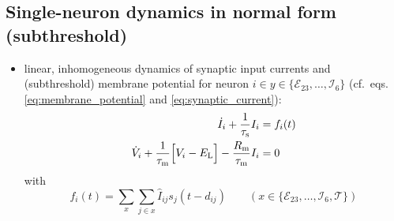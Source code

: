\documentclass[10pt,a4paper,twoside,american]{article}
\theoremstyle{definitionstyle}
\newcommand{\RM}{R_\text{m}}
\newcommand{\tauM}{\tau_\text{m}}
\newcommand{\tauS}{\tau_\text{s}}
\begin{document}
\clearpage
\renewcommand{\appendixtocname}{Appendix}
\renewcommand{\appendixpagename}{Appendix}
\renewcommand{\appendixname}{}
\begin{appendices}
  \renewcommand{\thesection}{A\arabic{section}}  
\section{Single-neuron dynamics in normal form (subthreshold)}
\label{sec:normal_form}
\begin{itemize}
\item linear, inhomogeneous dynamics of synaptic input currents and (subthreshold) membrane potential for neuron $i \in y\in\{\mathcal{E}_{23},\ldots,\mathcal{I}_{6}\}$ (cf.~eqs.\,\eqref{eq:membrane_potential} and \eqref{eq:synaptic_current}):
  \begin{equation}
    \label{eq:1st_order_ode}
    \begin{aligned}
      \dot{I}_{i} + \frac{1}{\tauS} I_{i} &= f_{i}(t)\\
      \dot{V}_{i} + \frac{1}{\tauM} \Bigl[ V_{i}-E_\text{L}\Bigr] - \frac{\RM}{\tauM} I_{i} &= 0
    \end{aligned}
  \end{equation}
  with
  \begin{equation}
	  f_{i}(t)=\sum_{x}\sum_{j\in x} \hat{I}_{ij} s_{j}(t-d_{ij})
    \qquad(x\in\{\mathcal{E}_{23},\ldots,\mathcal{I}_{6}, \mathcal{T}\})
  \end{equation}


\end{itemize}
\end{appendices}
\end{document}
